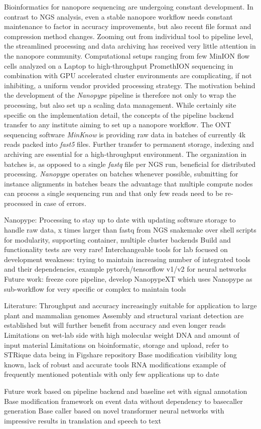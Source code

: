 Bioinformatics for nanopore sequencing are undergoing constant development.
In contrast to NGS analysis, even a stable nanopore workflow needs constant maintenance to factor in accuracy improvements, but also recent file format and compression method changes.
Zooming out from individual tool to pipeline level, the streamlined processing and data archiving has received very little attention in the nanopore community.
Computational setups ranging from few MinION flow cells analyzed on a Laptop to high-throughput PromethION sequencing in combination with GPU accelerated cluster environments are complicating, if not inhibiting, a uniform vendor provided processing strategy.
The motivation behind the development of the \textit{Nanopype} pipeline is therefore not only to wrap the processing, but also set up a scaling data management.
While certainly site specific on the implementation detail, the concepts of the pipeline backend transfer to any institute aiming to set up a nanopore workflow.
The ONT sequencing software \textit{MinKnow} is providing raw data in batches of currently 4k reads packed into \textit{fast5} files.
Further transfer to permanent storage, indexing and archiving are essential for a high-throughput environment.
The organization in batches is, as opposed to a single \textit{fastq} file per NGS run, beneficial for distributed processing.
\textit{Nanopype} operates on batches whenever possible, submitting for instance alignments in batches bears the advantage that multiple compute nodes can process a single sequencing run and that only few reads need to be re-processed in case of errors.



Nanopype: Processing to stay up to date with updating software
storage to handle raw data, x times larger than fastq from NGS
snakemake over shell scripts for modularity, supporting container, multiple cluster backends
Build and functionality tests are very rare!
Interchangeable tools for lab focused on development
weakness: trying to maintain increasing number of integrated tools and their dependencies, example pytorch/tensorflow v1/v2 for neural networks
Future work: freeze core pipeline, develop NanopypeXT which uses Nanopype as sub-workflow for very specific or complex to maintain tools

Literature: Throughput and accuracy increasingly suitable for application to large plant and mammalian genomes
Assembly and structural variant detection are established but will further benefit from accuracy and even longer reads
Limitations on wet-lab side with high molecular weight DNA and amount of input material
Limitations on bioinformatic, storage and upload, refer to STRique data being in Figshare repository
Base modification visibility long known, lack of robust and accurate tools
RNA modifications example of frequently mentioned potentials with only few applications up to date

Future work based on pipeline backend and baseline set with signal annotation
Base modification framework on event data without dependency to basecaller generation
Base caller based on novel transformer neural networks with impressive results in translation and speech to text







